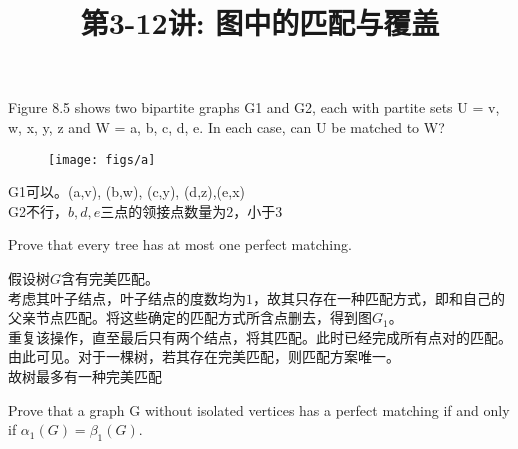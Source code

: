 \documentclass[a4paper, justified]{tufte-handout}
\title{第3-12讲: 图中的匹配与覆盖}
\date{\zhtoday} %
\begin{document}
\maketitle
\noplagiarism %
\begin{abstract}
\end{abstract}
\beginrequired

\begin{problem}[CZ 8.3]
 Figure 8.5 shows two bipartite graphs G1 and G2, each with partite sets U = {v, w, x, y, z } and W = {a, b, c, d, e}. In each case, can U be matched to W?
 \begin{figure}[htbp]
    \centering
    \texttt{[image: figs/a]}
  \end{figure}
\end{problem}

\begin{solution}
G1可以。(a,v), (b,w), (c,y), (d,z),(e,x)\\
G2不行，$b,d,e$三点的领接点数量为$2$，小于$3$
\end{solution}

\begin{problem}[CZ 8.5]
Prove that every tree has at most one perfect matching.
\end{problem}

\begin{solution}
假设树$G$含有完美匹配。\\
考虑其叶子结点，叶子结点的度数均为$1$，故其只存在一种匹配方式，即和自己的父亲节点匹配。将这些确定的匹配方式所含点删去，得到图$G_1$。\\
重复该操作，直至最后只有两个结点，将其匹配。此时已经完成所有点对的匹配。\\
由此可见。对于一棵树，若其存在完美匹配，则匹配方案唯一。\\
故树最多有一种完美匹配
\end{solution}

\begin{problem}[CZ 8.14]
 Prove that a graph G without isolated vertices has a perfect matching if and only if   $\alpha_1(G) = \beta_1(G)$.
\end{problem}
\end{document}

